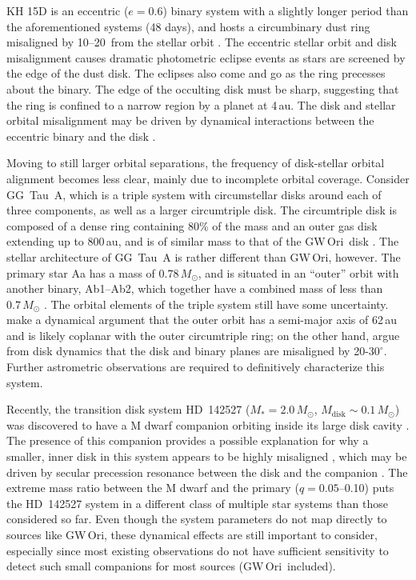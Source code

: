 \documentclass[twocolumn]{aastex61}
\newcommand{\obj}{GW\,Ori}
\begin{document}
KH 15D is an eccentric ($e=0.6$) binary system with a slightly longer period than the aforementioned systems (48 days), and hosts a circumbinary dust ring misaligned by 10--20\degr\ from the stellar orbit \citep{chiang04,capelo12}. The eccentric stellar orbit and disk misalignment causes dramatic photometric eclipse events as stars are screened by the edge of the dust disk. The eclipses also come and go as the ring precesses about the binary. The edge of the occulting disk must be sharp, suggesting that the ring is confined to a narrow region by a planet at 4\,au. The disk and stellar orbital misalignment may be driven by dynamical interactions between the eccentric binary and the disk \citep[e.g.,][]{martin17,zanazzi17}.

Moving to still larger orbital separations, the frequency of disk-stellar orbital alignment becomes less clear, mainly due to incomplete orbital coverage. Consider GG~Tau~A, which is a triple system with circumstellar disks around each of three components, as well as a larger circumtriple disk. The circumtriple disk is composed of a dense ring containing 80\% of the mass and an outer gas disk extending up to 800\,au, and is of similar mass to that of the \obj\ disk \citep[$0.12\,M_\odot$;][]{guilloteau99}. The stellar architecture of GG~Tau~A is rather different than \obj, however. The primary star Aa has a mass of $0.78\,M_\odot$, and is situated in an ``outer'' orbit with another binary, Ab1--Ab2, which together have a combined mass of less than $0.7\,M_\odot$ \citep{dutrey16}. The orbital elements of the triple system still have some uncertainty. \citet{nelson16} make a dynamical argument that the outer orbit has a semi-major axis of 62\,au and is likely coplanar with the outer circumtriple ring; on the other hand, \citet{cazzoletti17} argue from disk dynamics that the disk and binary planes are misaligned by 20-$30^\circ$. Further astrometric observations are required to definitively characterize this system.

Recently, the transition disk system HD~142527 ($M_\ast = 2.0\,M_\odot$, $M_\mathrm{disk} \sim 0.1\,M_\odot$) was discovered to have a M dwarf companion orbiting inside its large disk cavity \citep{biller12,lacour16}. The presence of this companion provides a possible explanation for why a smaller, inner disk in this system appears to be highly misaligned \citep[$\sim$70\degr;][]{avenhaus14,marino15}, which may be driven by secular precession resonance between the disk and the companion \citep{owen17}.
The extreme mass ratio between the M dwarf and the primary ($q = 0.05$--0.10) puts the HD~142527 system in a different class of multiple star systems than those considered so far. Even though the system parameters do not map directly to sources like \obj, these dynamical effects are still important to consider, especially since most existing observations do not have sufficient sensitivity to detect such small companions for most sources (\obj\ included).
\end{document}
